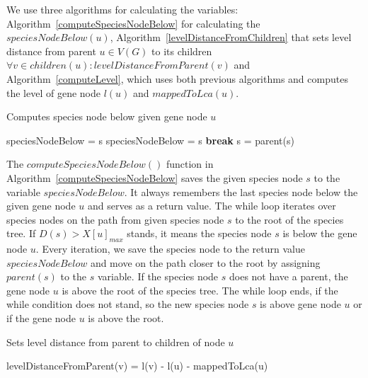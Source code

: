 We use three algorithms for calculating the variables: Algorithm~\ref{computeSpeciesNodeBelow} for calculating the $speciesNodeBelow(u)$, Algorithm~\ref{levelDistanceFromChildren} that sets level distance from parent $u \in V(G)$ to its children $\forall v \in children(u): levelDistanceFromParent(v)$ and Algorithm~\ref{computeLevel}, which uses both previous algorithms and computes the level of gene node $l(u)$ and $mappedToLca(u)$.

\begin{algorithm}
\caption{Computes species node below given gene node $u$} 
\label{computeSpeciesNodeBelow}
\begin{algorithmic}[1]
	\State speciesNodeBelow = s
		\State speciesNodeBelow = s
			\State \textbf{break}
		\Else
			\State s = parent(s)
		\EndIf
	\EndWhile
\EndFunction
\end{algorithmic}
\end{algorithm}

The $computeSpeciesNodeBelow()$ function in Algorithm~\ref{computeSpeciesNodeBelow} saves the given species node $s$ to the variable $speciesNodeBelow$. It always remembers the last species node below the given gene node $u$ and serves as a return value. The while loop iterates over species nodes on the path from given species node $s$ to the root of the species tree. If $D(s) > X[u]_{max}$ stands, it means the species node $s$ is below the gene node $u$. Every iteration, we save the species node to the return value $speciesNodeBelow$ and move on the path closer to the root by assigning $parent(s)$ to the $s$ variable. If the species node $s$ does not have a parent, the gene node $u$ is above the root of the species tree. The while loop ends, if the while condition does not stand, so the new species node $s$ is above gene node $u$ or if the gene node $u$ is above the root.

\begin{algorithm}
\caption{Sets level distance from parent to children of node $u$} 
\label{levelDistanceFromChildren}
\begin{algorithmic}[1]
		\State levelDistanceFromParent(v) = l(v) - l(u) - mappedToLca(u)
	\EndFor
\EndFunction
\end{algorithmic}
\end{algorithm}


